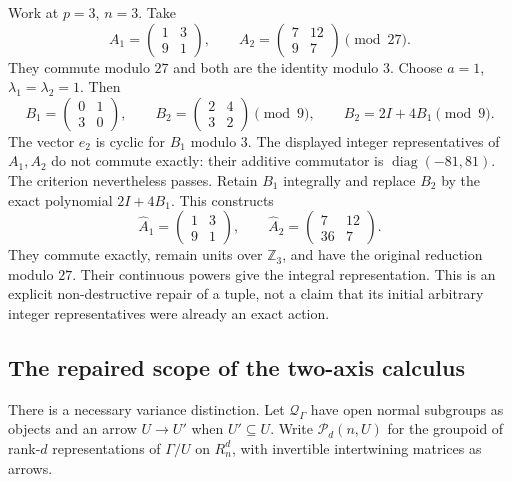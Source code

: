 \begin{example}\label{ex:abelian-positive-repair}
Work at $p=3$, $n=3$. Take
\[
 A_1=\begin{pmatrix}1&3\\9&1\end{pmatrix},\qquad
 A_2=\begin{pmatrix}7&12\\9&7\end{pmatrix}\pmod{27}.
\]
They commute modulo $27$ and both are the identity modulo $3$. Choose $a=1$, $\lambda_1=\lambda_2=1$. Then
\[
 B_1=\begin{pmatrix}0&1\\3&0\end{pmatrix},\qquad
 B_2=\begin{pmatrix}2&4\\3&2\end{pmatrix}\pmod9,
 \qquad B_2=2I+4B_1\pmod9.
\]
The vector $e_2$ is cyclic for $B_1$ modulo $3$. The displayed integer representatives of $A_1,A_2$ do not commute exactly: their additive commutator is $\operatorname{diag}(-81,81)$. The criterion nevertheless passes. Retain $B_1$ integrally and replace $B_2$ by the exact polynomial $2I+4B_1$. This constructs
\[
 \widehat A_1=\begin{pmatrix}1&3\\9&1\end{pmatrix},\qquad
 \widehat A_2=\begin{pmatrix}7&12\\36&7\end{pmatrix}.
\]
They commute exactly, remain units over $\mathbb Z_3$, and have the original reduction modulo $27$. Their continuous powers give the integral representation. This is an explicit non-destructive repair of a tuple, not a claim that its initial arbitrary integer representatives were already an exact action.
\end{example}

\subsection{The repaired scope of the two-axis calculus}

There is a necessary variance distinction. Let $\mathcal Q_\Gamma$ have open normal subgroups as objects and an arrow $U\to U'$ when $U'\subseteq U$. Write $\mathscr P_d(n,U)$ for the groupoid of rank-$d$ representations of $\Gamma/U$ on $R_n^d$, with invertible intertwining matrices as arrows.

